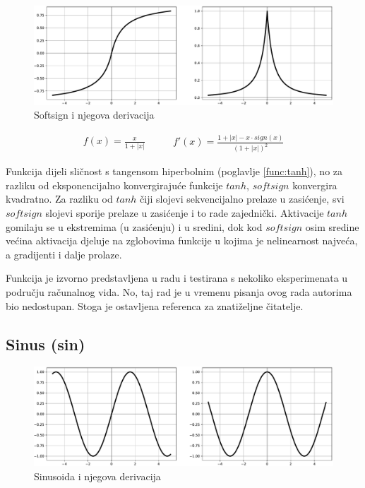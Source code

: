 \documentclass[times, utf8, numeric, diplomski]{fer}
\def\secref#1{(poglavlje \ref{#1})}
\begin{document}
\begin{figure}[H]
\includegraphics[width=\textwidth]{func_Softsign.pdf}
\centering
\caption{Softsign i njegova derivacija}
\label{fig:softsign}
\end{figure}

\begin{equation}
\label{eq:softsign}
\begin{split}
f(x) = \frac{x}{1+|x|}
\end{split}
\qquad
\begin{split}
f'(x) = \frac{1 + |x| - x \cdot sign(x)}{(1+|x|)^2}
\end{split}
\end{equation}

Funkcija dijeli sličnost s tangensom hiperbolnim \secref{func:tanh}, no za razliku od eksponencijalno konvergirajuće funkcije $tanh$, $softsign$ konvergira kvadratno. Za razliku od $tanh$ čiji slojevi sekvencijalno prelaze u zasićenje, svi $softsign$ slojevi sporije prelaze u zasićenje i to rade zajednički. Aktivacije $tanh$ gomilaju se u ekstremima (u zasićenju) i u sredini, dok kod $softsign$ osim sredine većina aktivacija djeluje na zglobovima funkcije u kojima je nelinearnost najveća, a gradijenti i dalje prolaze. \citep{xavier}

Funkcija je izvorno predstavljena u radu \citet{softsign_orig} i testirana s nekoliko eksperimenata u području računalnog vida. No, taj rad je u vremenu pisanja ovog rada autorima bio nedostupan. Stoga je ostavljena referenca za znatiželjne čitatelje.

\subsection{Sinus (sin)}

\begin{figure}[H]
\includegraphics[width=\textwidth]{func_Sin.pdf}
\centering
\caption{Sinusoida i njegova derivacija}
\label{fig:sin}
\end{figure}
\end{document}
